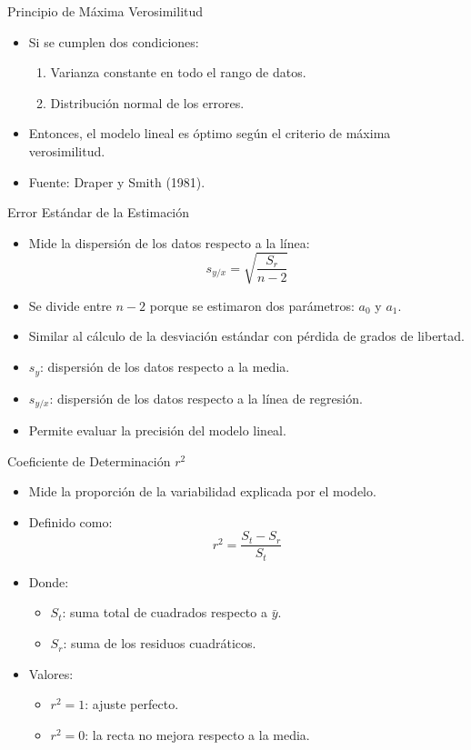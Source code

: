 \documentclass[main.tex]{subfiles}
\begin{document}
\begin{frame}{Principio de Máxima Verosimilitud}
  \begin{itemize}
    \item Si se cumplen dos condiciones:
    \begin{enumerate}
      \item Varianza constante en todo el rango de datos.
      \item Distribución normal de los errores.
    \end{enumerate}
    \item Entonces, el modelo lineal es óptimo según el criterio de máxima verosimilitud.
    \item Fuente: Draper y Smith (1981).
  \end{itemize}
\end{frame}

\begin{frame}{Error Estándar de la Estimación}
  \begin{itemize}
    \item Mide la dispersión de los datos respecto a la línea:
    \[
      s_{y/x} = \sqrt{\frac{S_r}{n - 2}}
    \]
    \item Se divide entre \(n - 2\) porque se estimaron dos parámetros: \(a_0\) y \(a_1\).
    \item Similar al cálculo de la desviación estándar con pérdida de grados de libertad.
  \end{itemize}
  \begin{itemize}
    \item \(s_y\): dispersión de los datos respecto a la media.
    \item \(s_{y/x}\): dispersión de los datos respecto a la línea de regresión.
    \item Permite evaluar la precisión del modelo lineal.
  \end{itemize}
\end{frame}

\begin{frame}{Coeficiente de Determinación \(r^2\)}
  \begin{itemize}
    \item Mide la proporción de la variabilidad explicada por el modelo.
    \item Definido como:
    \[
      r^2 = \frac{S_t - S_r}{S_t}
    \]
    \item Donde:
    \begin{itemize}
      \item \(S_t\): suma total de cuadrados respecto a \(\bar{y}\).
      \item \(S_r\): suma de los residuos cuadráticos.
    \end{itemize}
    \item Valores:
    \begin{itemize}
      \item \(r^2 = 1\): ajuste perfecto.
      \item \(r^2 = 0\): la recta no mejora respecto a la media.
    \end{itemize}
  \end{itemize}
\end{frame}
\end{document}
